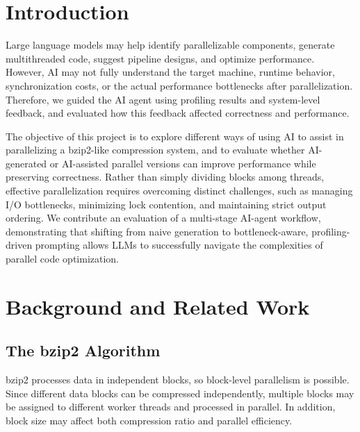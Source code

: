 \documentclass[conference]{IEEEtran}
\begin{document}
\section{Introduction}
Large language models may help identify parallelizable components, generate multithreaded code, suggest pipeline designs, and optimize performance. However, AI may not fully understand the target machine, runtime behavior, synchronization costs, or the actual performance bottlenecks after parallelization. Therefore, we guided the AI agent using profiling results and system-level feedback, and evaluated how this feedback affected correctness and performance.

The objective of this project is to explore different ways of using AI to assist in parallelizing a bzip2-like compression system, and to evaluate whether AI-generated or AI-assisted parallel versions can improve performance while preserving correctness. Rather than simply dividing blocks among threads, effective parallelization requires overcoming distinct challenges, such as managing I/O bottlenecks, minimizing lock contention, and maintaining strict output ordering. We contribute an evaluation of a multi-stage AI-agent workflow, demonstrating that shifting from naive generation to bottleneck-aware, profiling-driven prompting allows LLMs to successfully navigate the complexities of parallel code optimization.

\section{Background and Related Work}
\subsection{The bzip2 Algorithm}
bzip2 processes data in independent blocks, so block-level parallelism is possible. Since different data blocks can be compressed independently, multiple blocks may be assigned to different worker threads and processed in parallel. In addition, block size may affect both compression ratio and parallel efficiency.
\end{document}
